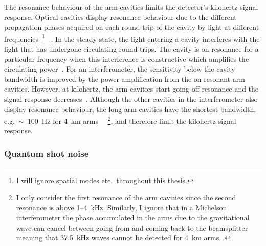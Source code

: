 The resonance behaviour of the arm cavities limits the detector's kilohertz signal response.
Optical cavities display resonance behaviour due to the different propagation phases acquired on each round-trip of the cavity by light at different frequencies~\footnote{I will ignore spatial modes etc.\ throughout this thesis.}~\cite{} . In the steady-state, the light entering a cavity interferes with the light that has undergone circulating round-trips. The cavity is on-resonance for a particular frequency when this interference is constructive which amplifies the circulating power~\cite{}. %
For an interferometer, the sensitivity below the cavity bandwidth is improved by the power amplification from the on-resonant arm cavities. However, at kilohertz, the arm cavities start going off-resonance and the signal response decreases~\cite{}. %
Although the other cavities in the interferometer also display resonance behaviour, the long arm cavities have the shortest bandwidth, e.g.\ $\sim$~100~Hz for 4~km arms ~\cite{}~\footnote{I only consider the first resonance of the arm cavities since the second resonance is above 1--4~kHz. Similarly, I ignore that in a Michelson interferometer the phase accumulated in the arms due to the gravitational wave can cancel between going from and coming back to the beamsplitter meaning that 37.5~kHz waves cannot be detected for 4~km arms~\cite{}.}, and therefore limit the kilohertz signal response.

\subsubsection{Quantum shot noise} %

